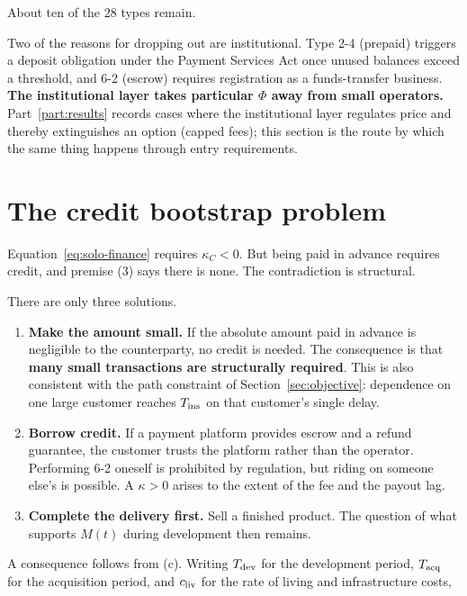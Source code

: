 About ten of the 28 types remain.

\begin{remark}
Two of the reasons for dropping out are institutional. Type 2-4 (prepaid) triggers a deposit
obligation under the Payment Services Act once unused balances exceed a threshold, and 6-2
(escrow) requires registration as a funds-transfer business.
\textbf{The institutional layer takes particular $\Phi$ away from small operators.}
Part~\ref{part:results} records cases where the institutional layer regulates price and
thereby extinguishes an option (capped fees); this section is the route by which the same
thing happens through entry requirements.
\end{remark}

\section{The credit bootstrap problem}
\label{sec:bootstrap}

Equation~\eqref{eq:solo-finance} requires $\kappa_C<0$. But being paid in advance requires
credit, and premise (3) says there is none. The contradiction is structural.

There are only three solutions.

\begin{enumerate}[label=(\alph*)]
\item \textbf{Make the amount small.} If the absolute amount paid in advance is negligible to
the counterparty, no credit is needed. The consequence is that
\textbf{many small transactions are structurally required}. This is also consistent with the
path constraint of Section~\ref{sec:objective}: dependence on one large customer reaches
$T_{\mathrm{ins}}$ on that customer's single delay.

\item \textbf{Borrow credit.} If a payment platform provides escrow and a refund guarantee,
the customer trusts the platform rather than the operator. Performing 6-2 oneself is
prohibited by regulation, but riding on someone else's is possible. A $\kappa>0$ arises to
the extent of the fee and the payout lag.

\item \textbf{Complete the delivery first.} Sell a finished product. The question of what
supports $M(t)$ during development then remains.
\end{enumerate}

A consequence follows from (c). Writing $T_{\rm dev}$ for the development period,
$T_{\rm acq}$ for the acquisition period, and $c_{\rm liv}$ for the rate of living and
infrastructure costs,

